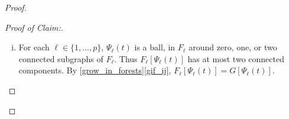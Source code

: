 \documentclass{patmorin}
\newcommand{\pat}[1]{\textcolor{Blue}{Pat: #1}}
\newcommand{\piotr}[1]{\textcolor{red}{Piotr: #1}}
\newenvironment{clmproof}{\begin{proof}[Proof of Claim:]\renewcommand{\qedsymbol}{\rule{1ex}{1ex}}}{\end{proof}}
\begin{document}
\begin{proof}
\begin{clmproof}
\begin{enumerate}[(i)]
    \item For each $\ell\in\{1,\ldots,p\}$, $\Psi_\ell(t)$ is a ball, in $F_\ell$ around zero, one, or two connected subgraphs of $F_\ell$.  Thus $F_\ell[\Psi_\ell(t)]$ has at most two connected components.  By \cref{grow_in_forests}\cref{gif_ij}, $F_\ell[\Psi_{\ell}(t)]=G[\Psi_{\ell}(t)]$. \qedhere
  \end{enumerate}
\end{clmproof}


\end{proof}
\end{document}
